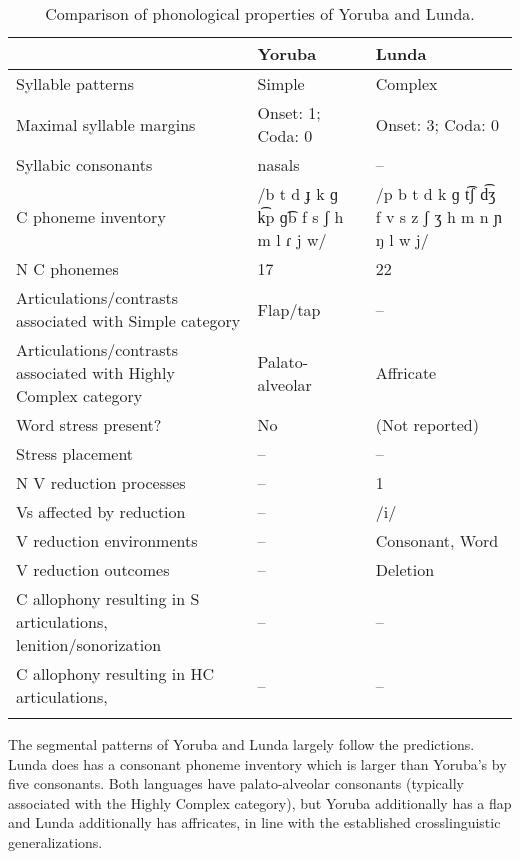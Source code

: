 \begin{table}
\small
\begin{tabularx}{\textwidth}{III}
\lsptoprule
 & {Yoruba} & {Lunda}\\
 \midrule 
 {Syllable patterns} & Simple & Complex\\
 \tablevspace
 {Maximal syllable margins} & Onset: 1; Coda: 0 & Onset: 3; Coda: 0\\
 \tablevspace
 {Syllabic consonants} & nasals & --\\
 \tablevspace
 {C phoneme inventory} & /b t d ɟ k ɡ k͡p ɡ͡b f s ʃ h m l ɾ j w/ & /p b t d k ɡ t͡ʃ d͡ʒ f v s z ʃ ʒ h m n ɲ ŋ l w j/\\
 \tablevspace
 {N C phonemes} & 17 & 22\\
 \tablevspace
 {Articulations/contrasts associated with {Simple}} {category} & {Flap/tap} & {--}\\
 \tablevspace
 {Articulations/contrasts associated with {Highly Complex}} {category} & {Palato-alveolar} & { {Affricate}}\\
 \tablevspace
 {Word stress present?} & {No} & {(Not reported)}\\
 \tablevspace
 {Stress placement} & {--} & {--}\\
 \tablevspace
 {N V reduction processes} & {--} & {1}\\
 \tablevspace
 {Vs affected by reduction}  & {--} & {/i/}\\
 \tablevspace
 {V reduction environments} & {--} & {Consonant, Word}\\
 \tablevspace
 {V reduction outcomes} & {--} & {Deletion}\\
 \tablevspace
 {C allophony resulting in S articulations, lenition/sonorization} & {--} & {--}\\
 \tablevspace
{ {C allophony resulting in HC articulations,} } & {--} & {--}\\
\lspbottomrule
\end{tabularx}
\caption{\label{tab:8.4}Comparison of phonological properties of Yoruba and Lunda.}
\end{table}

  The segmental patterns of Yoruba and Lunda largely follow the predictions. Lunda does has a consonant phoneme inventory which is larger than Yoruba’s by five consonants. Both languages have palato-alveolar consonants (typically associated with the Highly Complex category), but Yoruba additionally has a flap and Lunda additionally has affricates, in line with the established crosslinguistic generalizations.


